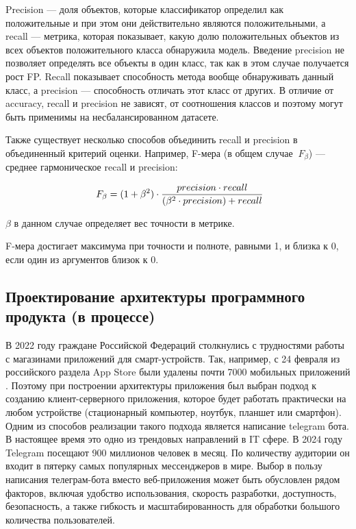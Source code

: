 \documentclass[a4paper,12pt]{extarticle}
\begin{document}
Precision — доля объектов, которые классификатор определил как положительные и при этом они действительно являются положительными, а recall — метрика, которая показывает, какую долю положительных объектов из всех объектов положительного класса обнаружила модель. Введение precision не позволяет определять все объекты в один класс, так как в этом случае получается рост FP. Recall показывает способность метода вообще обнаруживать данный класс, а precision — способность отличать этот класс от других. В отличие от accuracy, recall и precision не зависят, от соотношения классов и поэтому могут быть применимы на несбалансированном датасете.

Также существует несколько способов объединить recall и precision в объединенный критерий оценки. Например, F-мера (в общем случае $\ F_\beta$) — среднее гармоническое recall и precision:

\begin{equation}
	\label{acc3}
	\large \ F_\beta = (1 + \beta^2) \cdot \frac{precision \cdot recall}{(\beta^2 \cdot precision) + recall}
\end{equation}

$\beta$ в данном случае определяет вес точности в метрике. 

F-мера достигает максимума при точности и полноте, равными 1, и близка к 0, если один из аргументов близок к 0.


\subsection{Проектирование архитектуры программного продукта (в процессе)}
В 2022 году граждане Российской Федераций столкнулись с трудностями работы с магазинами приложений для смарт-устройств. Так, например, с 24 февраля из российского раздела App Store были удалены почти 7000 мобильных приложений \cite{russia_app}. Поэтому при построении архитектуры приложения был выбран подход к созданию клиент-серверного приложения, которое будет работать практически на любом устройстве (стационарный компьютер, ноутбук, планшет или смартфон). Одним из способов реализации такого подхода является написание telegram  бота. В настоящее время это одно из трендовых направлений в IT сфере. В 2024 году Telegram посещают 900 миллионов человек в месяц. По количеству аудитории он входит в пятерку самых популярных мессенджеров в мире. Выбор в пользу написания телеграм-бота вместо веб-приложения может быть обусловлен рядом факторов, включая удобство использования, скорость разработки, доступность, безопасность, а также гибкость и масштабированность для обработки большого количества пользователей.
\end{document}
